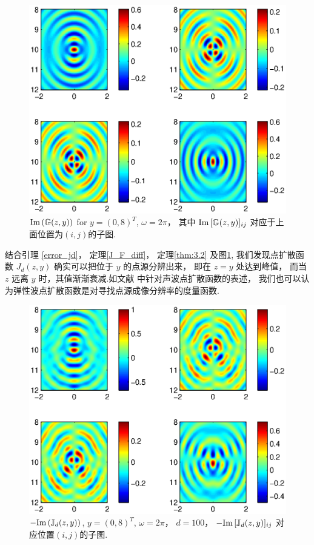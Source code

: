 \begin{figure}[htbp]
	\centering
	\includegraphics[width=\textwidth]{./Img/graphic/green_om_2_lm_5_mu_25_im.eps}	
	\caption{$\mathrm{Im}\,(\mathbb{G}(z,y))$ for $y=(0,8)^T$, $\omega=2\pi$， 其中 $\mathrm{Im}\, [\mathbb{G}(z,y)]_{ij}$ 对应于上面位置为$(i,j)$的子图.}\label{figure_psf}
\end{figure}

结合引理 \ref{error_jd}， 定理\ref{J_F_diff}， 定理\ref{thm:3.2} 及图\ref{figure_psf}, 我们发现点扩散函数 $J_d(z,y)$ 确实可以把位于 $y$ 的点源分辨出来， 即在 $z=y$ 处达到峰值， 而当 $z$ 远离 $y$ 时，其值渐渐衰减.如文献 \cite{RTMhalf_aco} 中针对声波点扩散函数的表述， 我们也可以认为弹性波点扩散函数是对寻找点源成像分辨率的度量函数.

\begin{figure}[htbp]
	\centering
	\includegraphics[width=\textwidth]{./Img/graphic/psf_om_2_lm_5_mu_25_im.eps}	
	\caption{$-\mathrm{Im}\,(\mathbb{J}_d(z,y))$, $y=(0,8)^T$, $\omega=2\pi$， $d=100$， $-\mathrm{Im}\, [\mathbb{J}_d(z,y)]_{ij}$ 对应位置$(i,j)$的子图. }\label{figure_green}
\end{figure}

